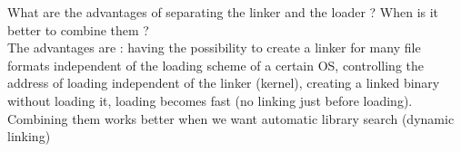 \documentclass{article}
\begin{document}
\noindent What are the advantages of  separating the linker and the loader ? When is it better to combine them ?\\
The advantages are : having the possibility to create a linker for many file formats independent of the loading scheme of a certain OS, controlling the address of loading independent of the linker (kernel), creating a linked binary without loading it, loading becomes fast (no linking just before loading).\\
Combining them works better when we want automatic library search (dynamic linking)
\end{document}
